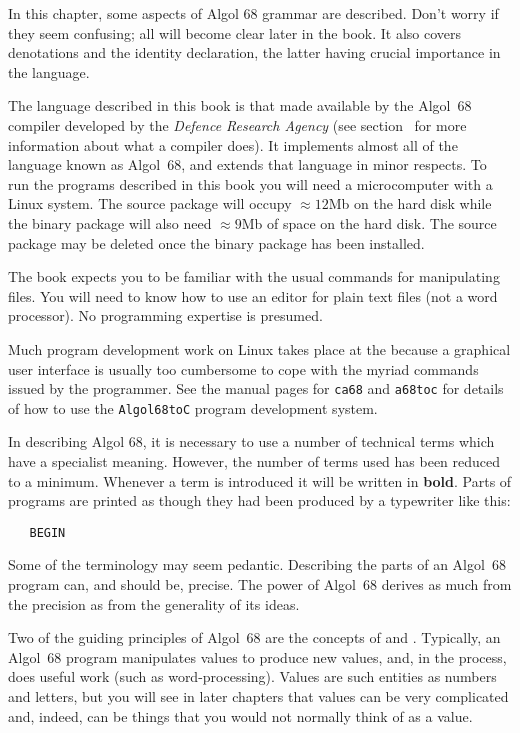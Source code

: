 In this chapter, some aspects of Algol 68 grammar are described.
Don't worry if they seem confusing; all will become clear later in
the book.  It also covers denotations and the identity declaration,
the latter having crucial importance in the language.

The language described in this book is that made available by the
 Algol~68 compiler developed by the
\emph{Defence Research Agency} (see section~ for more
information about what a compiler does).  It implements almost all of
the language known as Algol~68, and extends that language in minor
respects.  To run the programs described in this book you will need a
microcomputer with a Linux system. The source package will occupy
$\approx12$Mb on the hard disk while the binary package will also need
$\approx9$Mb of space on the hard disk. The source package may be
deleted once the binary package has been installed.

The book expects you to be familiar with the usual commands for
manipulating files. You will need to know how to use an editor for
plain text files (not a word processor).  No programming expertise is
presumed.

Much program development work on Linux takes place at the  because a graphical user interface is usually too cumbersome to
cope with the myriad commands issued by the programmer.  See the
manual pages for \verb|ca68| and \verb|a68toc| for details of how to
use the \verb|Algol68toC| program development system.

In describing Algol 68, it is necessary to use a number of technical
terms which have a specialist meaning. However, the number of terms
used has been reduced to a minimum. Whenever a term is introduced it
will be written in \textbf{bold}. Parts of programs are printed as though
they had been produced by a typewriter like this:
\begin{verbatim}
   BEGIN
\end{verbatim}
\noindent
Some of the terminology may seem pedantic. Describing the parts of an
Algol~68 program can, and should be, precise. The power of Algol~68
derives as much from the precision as from the generality of its ideas.

Two of the guiding principles of Algol~68 are the concepts of
 and .  Typically, an Algol~68 program
manipulates values to produce new values, and, in the process, does
useful work (such as word-processing). Values are such entities as
numbers and letters, but you will see in later chapters that values
can be very complicated and, indeed, can be things that you would not
normally think of as a value.

